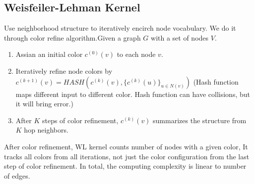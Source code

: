 \subsection{Weisfeiler-Lehman Kernel}
Use neighborhood structure to iteratively encirch node vocabulary. We do it through color refine algorithm.Given a graph $G$ with a set of nodes $V$. 
    \begin{enumerate}
        \item Assian an initial color $c^{(0)}(v)$ to each node $v$. 
        \item Iteratively refine node colors by $c^{(k+1)}(v) = HASH(c^{(k)}(v),\{c^{(k)}(u)\}_{u \in N(v)})$ (Hash function maps different input to different color. Hash function can have collisions, but it will bring error.)
        \item After $K$ steps of color refinement, $c^{(k)}(v)$ summarizes the structure from $K$ hop neighbors. 
    \end{enumerate}
After color refinement, WL kernel counts number of nodes with a given color, It tracks all colors from all iterations, not just the color configuration from the last step of color refinement. In total, the computing complexity is linear to number of edges. 

